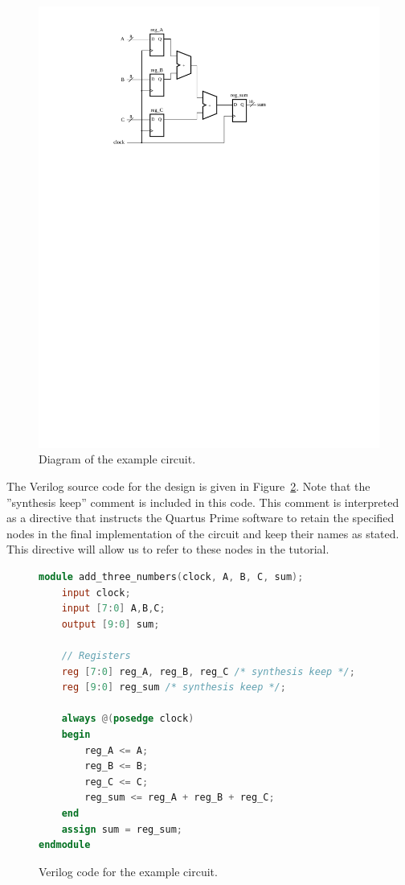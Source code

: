 \documentclass[11pt, twoside, pdftex]{article}
\begin{document}
\begin{figure}[H]
\begin{center}
\includegraphics[scale=.75]{figures/design_example.pdf}
\end{center}
\caption{Diagram of the example circuit.}
\label{fig:design_example}
\end{figure}

The Verilog source code for the design is given in Figure~\ref{fig:design_verilog_code}. Note that the ''synthesis keep''
comment is included in this code. This comment is interpreted as a directive that
instructs the Quartus Prime software to retain the specified
nodes in the final implementation of the circuit and keep their names as stated. This directive will allow us to refer to these nodes
in the tutorial. 

\begin{figure}[H]
\begin{lstlisting}[language=Verilog, xleftmargin=3cm]
module add_three_numbers(clock, A, B, C, sum);
    input clock;
    input [7:0] A,B,C;
    output [9:0] sum;

    // Registers
    reg [7:0] reg_A, reg_B, reg_C /* synthesis keep */;
    reg [9:0] reg_sum /* synthesis keep */;

    always @(posedge clock)
    begin
        reg_A <= A;
        reg_B <= B;
        reg_C <= C;
        reg_sum <= reg_A + reg_B + reg_C;
    end
    assign sum = reg_sum;
endmodule
\end{lstlisting}
\caption{Verilog code for the example circuit.}
\label{fig:design_verilog_code}
\end{figure}
\end{document}
